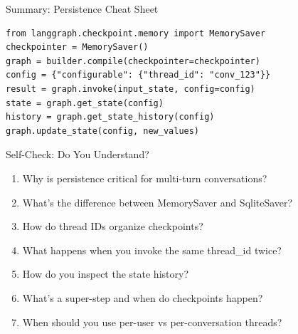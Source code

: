\documentclass[aspectratio=169,11pt]{beamer}
\begin{document}
\begin{frame}[fragile]{Summary: Persistence Cheat Sheet}
  \begin{codebox}
    \begin{lstlisting}
from langgraph.checkpoint.memory import MemorySaver
checkpointer = MemorySaver()
graph = builder.compile(checkpointer=checkpointer)
config = {"configurable": {"thread_id": "conv_123"}}
result = graph.invoke(input_state, config=config)
state = graph.get_state(config)
history = graph.get_state_history(config)
graph.update_state(config, new_values)
    \end{lstlisting}
  \end{codebox}
\end{frame}

\begin{frame}{Self-Check: Do You Understand?}
  \begin{enumerate}
    \setlength{\itemsep}{1pt}
    \item Why is persistence critical for multi-turn conversations?
    \item What's the difference between MemorySaver and SqliteSaver?
    \item How do thread IDs organize checkpoints?
    \item What happens when you invoke the same thread\_id twice?
    \item How do you inspect the state history?
    \item What's a super-step and when do checkpoints happen?
    \item When should you use per-user vs per-conversation threads?
  \end{enumerate}
\end{frame}
\end{document}
